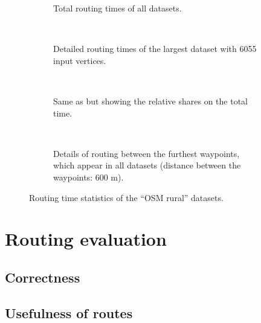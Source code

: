 			\begin{figure}[h!]
				\begin{figcenter}
					\begin{subfigure}[t]{\textwidth}
						\begin{figcenter}
							
						\end{figcenter}
						\caption{Total routing times of all datasets.}
					\end{subfigure}
					\\[3ex]
					\begin{subfigure}[t]{\textwidth}
						\begin{figcenter}
							
						\end{figcenter}
						\caption{Detailed routing times of the largest dataset with 6055 input vertices.}
						\label{fig:eval-rural-routing-details-b}
					\end{subfigure}
					\\[3ex]
					\begin{subfigure}[t]{\textwidth}
						\begin{figcenter}
							
						\end{figcenter}
						\caption{Same as  but showing the relative shares on the total time.}
					\end{subfigure}
					\\[3ex]
					\begin{subfigure}[t]{\textwidth}
						\begin{figcenter}
							
						\end{figcenter}
						\caption{Details of routing between the furthest waypoints, which appear in all datasets (distance between the waypoints: 600 m).}
					\end{subfigure}
				\end{figcenter}
				\caption{Routing time statistics of the \enquote{OSM rural} datasets.}
			\end{figure}
			
		
		
	
\section{Routing evaluation}

	\subsection{Correctness}
	

	\subsection{Usefulness of routes}
	
